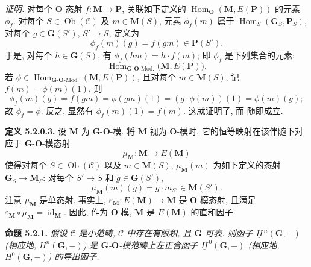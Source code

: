 \medskip
\noindent\textit{证明.}
对每个 \(\mathbf O\)-态射 \(f:\mathbf M\to\mathbf P\), 关联如下定义的
\(\operatorname{Hom}_{\mathbf O}(\mathbf M,E(\mathbf P))\) 的元素 \(\phi_f\).
对每个 \(S\in\operatorname{Ob}(\mathscr C)\) 及
\(m\in\mathbf M(S)\), 元素 \(\phi_f(m)\) 属于
\(\operatorname{Hom}_S(\mathbf G_S,\mathbf P_S)\), 对每个
\(g\in\mathbf G(S')\), \(S'\to S\), 定义为
\[
  \phi_f(m)(g)=f(gm)\in\mathbf P(S').
\]
于是, 对每个 \(h\in\mathbf G(S)\), 有
\(\phi_f(hm)=h\cdot f(m)\); 即 \(\phi_f\) 是下列集合的元素:
\[
  \operatorname{Hom}_{\mathbf G\text{-}\mathbf O\text{-Mod.}}
    \bigl(\mathbf M,E(\mathbf P)\bigr).
\]
若
\(\phi\in\operatorname{Hom}_{\mathbf G\text{-}\mathbf O\text{-Mod.}}
  (\mathbf M,E(\mathbf P))\), 且对每个 \(m\in\mathbf M(S)\),
记 \(f(m)=\phi(m)(1)\), 则
\[
  \phi_f(m)(g)
    =f(gm)
    =\phi(gm)(1)
    =(g\cdot\phi(m))(1)
    =\phi(m)(g);
\]
故 \(\phi_f=\phi\). 反之, 显然有
\(\phi_f(m)(1)=f(m)\). 这就证明了,
而 随即成立.

\medskip
\noindent{}\textbf{定义 5.2.0.3.}
设 \(\mathbf M\) 为 \(\mathbf G\)-\(\mathbf O\)-模.
将 \(\mathbf M\) 视为 \(\mathbf O\)-模时, 它的恒等映射在该伴随下对应于
\(\mathbf G\)-\(\mathbf O\)-模态射
\[
  \mu_{\mathbf M}:\mathbf M\longrightarrow E(\mathbf M)
\]
使得对每个 \(S\in\operatorname{Ob}(\mathscr C)\) 以及
\(m\in\mathbf M(S)\), \(\mu_{\mathbf M}(m)\) 为如下定义的态射
\(\mathbf G_S\to\mathbf M_S\): 对每个
\(S'\to S\) 和 \(g\in\mathbf G(S')\),
\[
  \mu_{\mathbf M}(m)(g)=g\cdot m_{S'}\in\mathbf M(S').
\]
注意 \(\mu_{\mathbf M}\) 是单态射. 事实上,
\(\varepsilon_{\mathbf M}:E(\mathbf M)\to\mathbf M\) 是
\(\mathbf O\)-模态射, 且满足
\(\varepsilon_{\mathbf M}\circ\mu_{\mathbf M}
  =\operatorname{id}_{\mathbf M}\). 因此, 作为
\(\mathbf O\)-模, \(\mathbf M\) 是 \(E(\mathbf M)\) 的直和因子.

\medskip
\noindent{}\textbf{命题 5.2.1.}
\textit{假设 \(\mathscr C\) 是小范畴, \(\mathscr C\) 中存在有限积,
且 \(\mathbf G\) 可表. 则函子
\(\underline H^{\,n}(\mathbf G,-)\) (相应地,
\(H^n(\mathbf G,-)\)) 是 \(\mathbf G\)-\(\mathbf O\)-模范畴上左正合函子
\(\underline H^{\,0}(\mathbf G,-)\) (相应地,
\(H^0(\mathbf G,-)\)) 的导出函子.}

